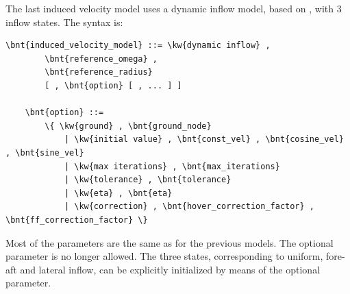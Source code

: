 The last induced velocity model uses a dynamic inflow model,
based on \cite{PITT}, with 3 inflow states.
The syntax is:
\begin{Verbatim}[commandchars=\\\{\}]
    \bnt{induced_velocity_model} ::= \kw{dynamic inflow} ,
        \bnt{reference_omega} ,
        \bnt{reference_radius}
        [ , \bnt{option} [ , ... ] ]

    \bnt{option} ::=
        \{ \kw{ground} , \bnt{ground_node}
            | \kw{initial value} , \bnt{const_vel} , \bnt{cosine_vel} , \bnt{sine_vel}
            | \kw{max iterations} , \bnt{max_iterations}
            | \kw{tolerance} , \bnt{tolerance}
            | \kw{eta} , \bnt{eta}
            | \kw{correction} , \bnt{hover_correction_factor} , \bnt{ff_correction_factor} \}
\end{Verbatim}
Most of the parameters are the same as for the previous models.
The optional  parameter is no longer allowed.
The three states, corresponding to uniform, fore-aft and lateral inflow,
can be explicitly initialized by means of the optional
 parameter.

